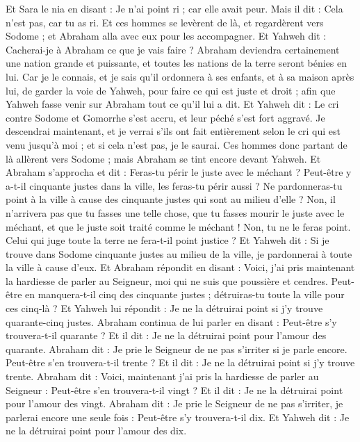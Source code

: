 \begin{multicols}{2}
Et Sara le nia en disant : Je n'ai point ri ; car elle avait peur. Mais il dit : Cela n'est pas, car tu as ri.
Et ces hommes se levèrent de là, et regardèrent vers Sodome ; et Abraham alla  avec eux pour les accompagner.
Et Yahweh dit : Cacherai-je à Abraham ce que je vais faire ?
Abraham deviendra certainement une nation grande et puissante, et toutes les nations de la terre seront bénies en lui.
Car je le connais, et je sais qu'il ordonnera à ses enfants, et à sa maison après lui, de garder la voie de Yahweh, pour faire ce qui est juste et droit ; afin que Yahweh fasse venir sur Abraham tout ce qu'il lui a dit.
Et Yahweh dit : Le cri contre Sodome et Gomorrhe s’est accru, et leur péché s’est fort aggravé.
Je descendrai maintenant, et je verrai s'ils ont fait entièrement selon le cri qui est venu jusqu'à moi ; et si cela n'est pas, je le saurai.
Ces hommes donc partant de là allèrent vers Sodome ; mais Abraham se tint encore devant Yahweh.
Et Abraham s'approcha et dit : Feras-tu périr le juste avec le méchant ?
Peut-être y a-t-il cinquante justes dans la ville, les feras-tu périr aussi ? Ne pardonneras-tu point à la ville à cause des cinquante justes qui sont au milieu d’elle ?
Non, il n'arrivera pas que tu fasses une telle chose, que tu fasses mourir le juste avec le méchant, et que le juste soit traité comme le méchant ! Non, tu ne le feras point. Celui qui juge toute la terre ne fera-t-il point justice ?
Et Yahweh dit : Si je trouve dans Sodome cinquante justes au milieu de la ville, je pardonnerai à toute la ville à cause d'eux.
Et Abraham répondit en disant : Voici, j'ai pris maintenant la hardiesse de parler au Seigneur, moi qui ne suis que poussière et cendres.
Peut-être en manquera-t-il cinq des cinquante justes ; détruiras-tu toute la ville pour ces cinq-là ? Et Yahweh lui répondit : Je ne la détruirai point si j'y trouve quarante-cinq justes.
Abraham continua de lui parler en disant : Peut-être s'y trouvera-t-il quarante ? Et il dit : Je ne la détruirai point pour l'amour des quarante.
Abraham dit : Je prie le Seigneur de ne pas s'irriter si je parle encore. Peut-être s'en trouvera-t-il trente ? Et il dit : Je ne la détruirai point si j'y trouve trente.
Abraham dit : Voici, maintenant j'ai pris la hardiesse de parler au Seigneur : Peut-être s'en trouvera-t-il vingt ? Et il dit : Je ne la détruirai point pour l'amour des vingt.
Abraham dit : Je prie le Seigneur de ne pas s'irriter, je parlerai encore une seule fois : Peut-être s'y trouvera-t-il dix. Et Yahweh dit : Je ne la détruirai point pour l'amour des dix.

\end{multicols}
